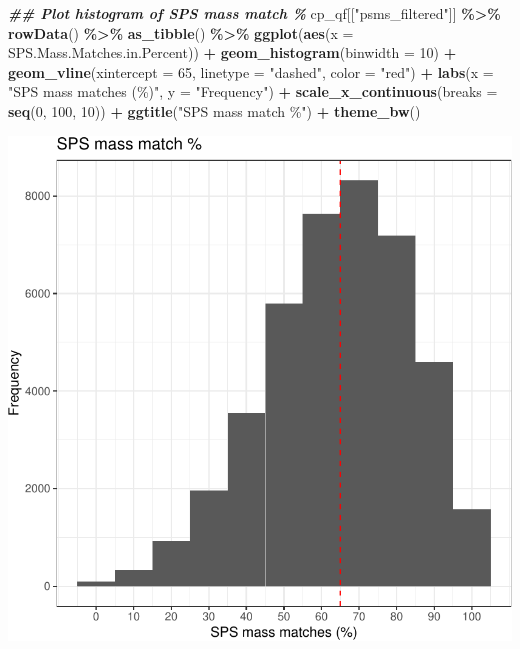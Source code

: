 \documentclass[9pt,a4paper,]{extarticle}
\newenvironment{Shaded}{\begin{snugshade}}{\end{snugshade}}
\newcommand{\AttributeTok}[1]{\textcolor[rgb]{0.13,0.29,0.53}{#1}}
\newcommand{\DecValTok}[1]{\textcolor[rgb]{0.00,0.00,0.81}{#1}}
\newcommand{\DocumentationTok}[1]{\textcolor[rgb]{0.56,0.35,0.01}{\textbf{\textit{#1}}}}
\newcommand{\FunctionTok}[1]{\textcolor[rgb]{0.13,0.29,0.53}{\textbf{#1}}}
\newcommand{\NormalTok}[1]{#1}
\newcommand{\SpecialCharTok}[1]{\textcolor[rgb]{0.81,0.36,0.00}{\textbf{#1}}}
\newcommand{\StringTok}[1]{\textcolor[rgb]{0.31,0.60,0.02}{#1}}
\begin{document}
\begin{Shaded}
\begin{Highlighting}[]
\DocumentationTok{\#\# Plot histogram of SPS mass match \%}
\NormalTok{cp\_qf[[}\StringTok{"psms\_filtered"}\NormalTok{]] }\SpecialCharTok{\%\textgreater{}\%}
  \FunctionTok{rowData}\NormalTok{() }\SpecialCharTok{\%\textgreater{}\%}
  \FunctionTok{as\_tibble}\NormalTok{() }\SpecialCharTok{\%\textgreater{}\%}
  \FunctionTok{ggplot}\NormalTok{(}\FunctionTok{aes}\NormalTok{(}\AttributeTok{x =}\NormalTok{ SPS.Mass.Matches.in.Percent)) }\SpecialCharTok{+}
  \FunctionTok{geom\_histogram}\NormalTok{(}\AttributeTok{binwidth =} \DecValTok{10}\NormalTok{) }\SpecialCharTok{+}
  \FunctionTok{geom\_vline}\NormalTok{(}\AttributeTok{xintercept =} \DecValTok{65}\NormalTok{, }\AttributeTok{linetype =} \StringTok{"dashed"}\NormalTok{, }\AttributeTok{color =} \StringTok{"red"}\NormalTok{) }\SpecialCharTok{+}
  \FunctionTok{labs}\NormalTok{(}\AttributeTok{x =} \StringTok{"SPS mass matches (\%)"}\NormalTok{, }\AttributeTok{y =} \StringTok{"Frequency"}\NormalTok{) }\SpecialCharTok{+}
  \FunctionTok{scale\_x\_continuous}\NormalTok{(}\AttributeTok{breaks =} \FunctionTok{seq}\NormalTok{(}\DecValTok{0}\NormalTok{, }\DecValTok{100}\NormalTok{, }\DecValTok{10}\NormalTok{)) }\SpecialCharTok{+}
  \FunctionTok{ggtitle}\NormalTok{(}\StringTok{"SPS mass match \%"}\NormalTok{) }\SpecialCharTok{+}
  \FunctionTok{theme\_bw}\NormalTok{()}
\end{Highlighting}
\end{Shaded}

\begin{center}\includegraphics[height=0.3\textheight]{workflow_expressions_files/figure-latex/tmt_sps_matches_2-1} \end{center}
\end{document}
